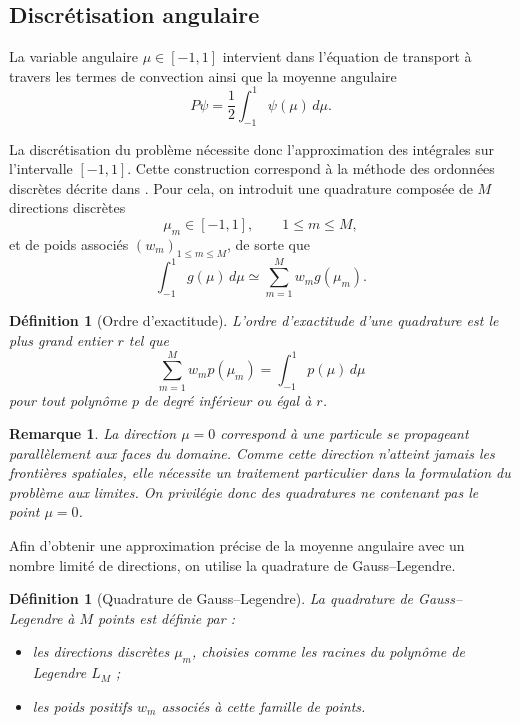 \documentclass{article}
\newtheorem{definition}[theorem]{Définition}
\newtheorem{remark}[theorem]{Remarque}
\begin{document}
\subsection {Discrétisation angulaire} 

La variable angulaire $\mu\in[-1,1]$ intervient dans l'équation de transport à travers les termes de convection ainsi que la moyenne angulaire 
\[
P\psi = \frac12\int_{-1}^{1}\psi(\mu)\,d\mu. 
\] 

La discrétisation du problème nécessite donc l'approximation des intégrales sur l'intervalle $[-1,1]$. Cette construction correspond à la méthode des ordonnées discrètes décrite dans \cite[chap.~5, section~5.2.2]{Allaire2018}. Pour cela, on introduit une quadrature composée de $M$ directions discrètes
\[ 
\mu_m\in[-1,1], \qquad 1\le m\le M, 
\] 
et de poids associés $(w_m)_{1\le m\le M}$, de sorte que 
\[
\int_{-1}^{1} g(\mu)\,d\mu \simeq \sum_{m=1}^{M} w_m g(\mu_m). 
\] 

\begin{definition}[Ordre d'exactitude] 
    L'ordre d'exactitude d'une quadrature est le plus grand entier $r$ tel que 
    \[
    \sum_{m=1}^{M} w_m p(\mu_m) = \int_{-1}^{1} p(\mu)\,d\mu 
    \] 
    pour tout polynôme $p$ de degré inférieur ou égal à $r$. 
\end{definition} 

\begin{remark} La direction $\mu=0$ correspond à une particule se propageant parallèlement aux faces du domaine. Comme cette direction n'atteint jamais les frontières spatiales, elle nécessite un traitement particulier dans la formulation du problème aux limites. On privilégie donc des quadratures ne contenant pas le point $\mu=0$. 
\end{remark} 

Afin d'obtenir une approximation précise de la moyenne angulaire avec un nombre limité de directions, on utilise la quadrature de Gauss--Legendre. 

\begin{definition}[Quadrature de Gauss--Legendre] 
    La quadrature de Gauss--Legendre à $M$ points est définie par : 
    \begin{itemize} 
        \item les directions discrètes $\mu_m$, choisies comme les racines du polynôme de Legendre $L_M$ ; 
        \item les poids positifs $w_m$ associés à cette famille de points. 
    \end{itemize} 
\end{definition} 
\end{document}

